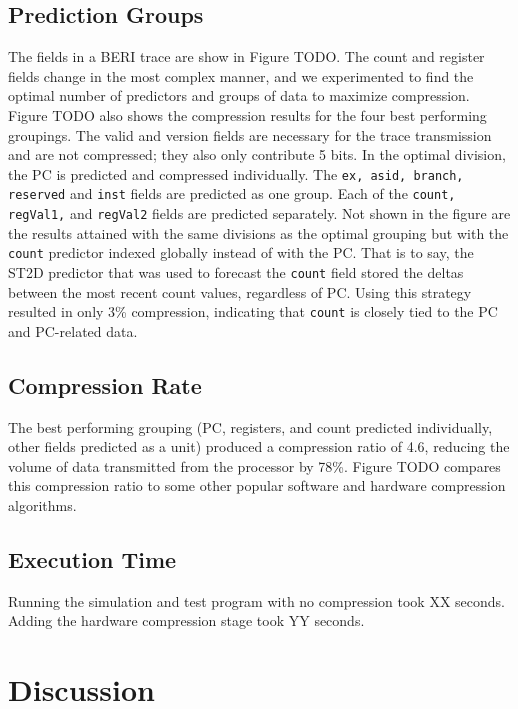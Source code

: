 \documentclass[conference]{IEEEtran}
\begin{document}
\subsection{Prediction Groups}
The fields in a BERI trace are show in Figure TODO. The count and register fields change in the most complex manner, and we experimented to find the optimal number of predictors and groups of data to maximize compression. Figure TODO also shows the compression results for the four best performing groupings. The valid and version fields are necessary for the trace transmission and are not compressed; they also only contribute 5 bits. In the optimal division, the PC is predicted and compressed individually. The \texttt{ex, asid, branch, reserved} and \texttt{inst} fields are predicted as one group. Each of the \texttt{count, regVal1,} and \texttt{regVal2} fields are predicted separately. Not shown in the figure are the results attained with the same divisions as the optimal grouping but with the \texttt{count} predictor indexed globally instead of with the PC. That is to say, the ST2D predictor that was used to forecast the \texttt{count} field stored the deltas between the most recent count values, regardless of PC. Using this strategy resulted in only 3\% compression, indicating that \texttt{count} is closely tied to the PC and PC-related data.

\subsection{Compression Rate}
The best performing grouping (PC, registers, and count predicted individually, other fields predicted as a unit) produced a compression ratio of 4.6, reducing the volume of data transmitted from the processor by 78\%. Figure TODO compares this compression ratio to some other popular software and hardware compression algorithms. %

\subsection{Execution Time}
Running the simulation and test program with no compression took XX seconds. Adding the hardware compression stage took YY seconds. 

\section{Discussion}
\end{document}
